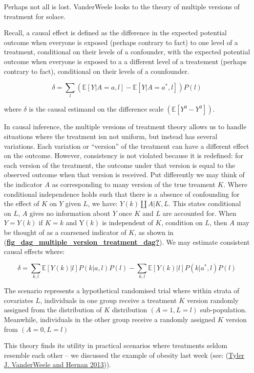\documentclass[
  singlecolumn]{report}
\begin{document}
Perhaps not all is lost. VanderWeele looks to the theory of multiple
versions of treatment for solace.

Recall, a causal effect is defined as the difference in the expected
potential outcome when everyone is exposed (perhaps contrary to fact) to
one level of a treatment, conditional on their levels of a confounder,
with the expected potential outcome when everyone is exposed to a a
different level of a treatement (perhaps contrary to fact), conditional
on their levels of a counfounder.

\[ \delta = \sum_l \left( \mathbb{E}[Y|A=a,l] - \mathbb{E}[Y|A=a^*,l] \right) P(l)\]

where \(\delta\) is the causal estimand on the difference scale
\((\mathbb{E}[Y^0 - Y^0])\).

In causal inference, the multiple versions of treatment theory allows us
to handle situations where the treatment isn not uniform, but instead
has several variations. Each variation or ``version'' of the treatment
can have a different effect on the outcome. However, consistency is not
violated because it is redefined: for each version of the treatment, the
outcome under that version is equal to the observed outcome when that
version is received. Put differently we may think of the indicator \(A\)
as corresponding to many version of the true treament \(K\). Where
conditional independence holds such that there is a absence of
confounding for the effect of \(K\) on \(Y\) given \(L\), we have:
\(Y(k)\coprod A|K,L\). This states conditional on \(L\), \(A\) gives no
information about \(Y\) once \(K\) and \(L\) are accounted for. When
\(Y = Y(k)\) if \(K = k\) and Y\((k)\) is independent of \(K\),
condition on \(L\), then \(A\) may be thought of as a coarsened
indicator of \(K\), as shown in
(\protect\hyperlink{ref-fig_dag_multiple_version_treatment_dag}{\textbf{fig\_dag\_multiple\_version\_treatment\_dag?}}).
We may estimate consistent causal effects where:

\[ \delta = \sum_{k,l} \mathbb{E}[Y(k)|l] P(k|a,l) P(l) - \sum_{k,l} \mathbb{E}[Y(k)|l] P(k|a^*,l) P(l)\]

The scenario represents a hypothetical randomised trial where within
strata of covariates \(L\), individuals in one group receive a treatment
\(K\) version randomly assigned from the distribution of \(K\)
distribution \((A = 1, L = l)\) sub-population. Meanwhile, individuals
in the other group receive a randomly assigned \(K\) version from
\((A = 0, L = l)\)

This theory finds its utility in practical scenarios where treatments
seldom resemble each other -- we discussed the example of obesity last
week (see: (\protect\hyperlink{ref-vanderweele2013}{Tyler J. VanderWeele
and Hernan 2013})).
\end{document}
